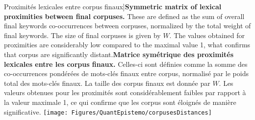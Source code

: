 \begin{table}
\caption[Lexical proximities between final corpuses][Proximités lexicales entre corpus finaux]{\textbf{Symmetric matrix of lexical proximities between final corpuses.} These are defined as the sum of overall final keywords co-occurrences between corpuses, normalized by the total weight of final keywords. The size of final corpuses is given by $W$. The values obtained for proximities are considerably low compared to the maximal value 1, what confirms that corpus are significantly distant.\label{tab:quantepistemo:lexical}}{\textbf{Matrice symétrique des proximités lexicales entre les corpus finaux.} Celles-ci sont définies comme la somme des co-occurrences pondérées de mots-clés finaux entre corpus, normalisé par le poids total des mots-clés finaux. La taille des corpus finaux est donnée par $W$. Les valeurs obtenues pour les proximités sont considérablement faibles par rapport à la valeur maximale 1, ce qui confirme que les corpus sont éloignés de manière significative.\label{tab:quantepistemo:lexical}}
\texttt{[image: Figures/QuantEpistemo/corpusesDistances]}
\end{table}









